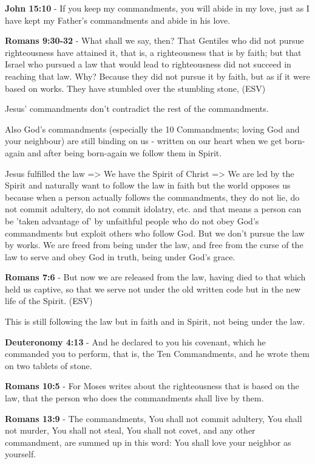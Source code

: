 \documentclass[11pt]{article}
\begin{document}
\textbf{John 15:10} - If you keep my commandments, you will abide in my love, just as I have kept my Father's commandments and abide in his love.

\textbf{Romans 9:30-32} - What shall we say, then? That Gentiles who did not pursue righteousness have attained it, that is, a righteousness that is by faith; but that Israel who pursued a law that would lead to righteousness did not succeed in reaching that law. Why? Because they did not pursue it by faith, but as if it were based on works. They have stumbled over the stumbling stone, (ESV)

Jesus' commandments don't contradict the rest of the commandments.

Also God's commandments (especially the 10 Commandments; loving God and your neighbour) are still binding on us - written on our heart when we get born-again and after being born-again we follow them in Spirit.

Jesus fulfilled the law => We have the Spirit of Christ => We are led by the Spirit and naturally want to follow the law in faith but the world opposes us because when a person actually follows the commandments, they do not lie, do not commit adultery, do not commit idolatry, etc. and that means a person can be 'taken advantage of' by unfaithful people who do not obey God's commandments but exploit others who follow God.
But we don't pursue the law by works. We are freed from being under the law, and free from the curse of the law to serve and obey God in truth, being under God's grace.

\textbf{Romans 7:6} - But now we are released from the law, having died to that which held us captive, so that we serve not under the old written code but in the new life of the Spirit. (ESV)

This is still following the law but in faith and in Spirit, not being under the law.

\textbf{Deuteronomy 4:13} - And he declared to you his covenant, which he commanded you to perform, that is, the Ten Commandments, and he wrote them on two tablets of stone.

\textbf{Romans 10:5} - For Moses writes about the righteousness that is based on the law, that the person who does the commandments shall live by them.

\textbf{Romans 13:9} - The commandments, You shall not commit adultery, You shall not murder, You shall not steal, You shall not covet, and any other commandment, are summed up in this word: You shall love your neighbor as yourself.
\end{document}
